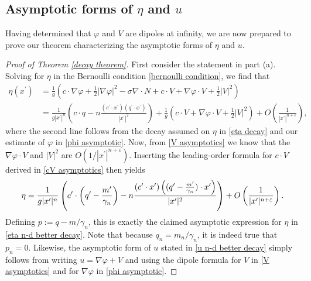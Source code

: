 \documentclass[11pt,reqno]{amsart}
\theoremstyle{plain}
\theoremstyle{remark}
\numberwithin{equation}{section}
\begin{document}
\subsection{Asymptotic forms of \texorpdfstring{$\eta$}{eta} and \texorpdfstring{$u$}{u}}

Having determined that $\varphi$ and $V$ are dipoles at infinity, we are now prepared to prove our theorem characterizing the asymptotic forms of $\eta$ and $u$.  

\begin{proof}[Proof of Theorem \ref{decay theorem}]  First consider the statement in part (a).  Solving for $\eta$ in the Bernoulli condition \eqref{bernoulli condition}, we find that 
\begin{align*}
\eta(x^\prime) & = \frac{1}{g} \left( c\cdot \nabla \varphi + \frac{1}{2} |\nabla \varphi|^2 - \sigma \nabla \cdot N + c \cdot V + \nabla \varphi \cdot V + \frac{1}{2}|V|^2 \right) \\
&= \frac{1}{g|x^\prime|^n} \left( c \cdot q - n \frac{(c^\prime \cdot x^\prime)( q^\prime \cdot x^\prime)}{|x^\prime|^2} \right) + \frac{1}{g} \left( c \cdot V + \nabla \varphi \cdot V + \frac{1}{2}|V|^2 \right) + O\left( \frac{1}{|x^\prime|^{n+\varepsilon}} \right),
\end{align*}
where the second line follows from the decay assumed on $\eta$ in \eqref{eta decay} and our estimate of $\varphi$ in \eqref{phi asymptotic}.  Now, from \eqref{V asymptotics} we know that the $\nabla \varphi \cdot V$ and $|V|^2$ are $O(1/|x^\prime|^{n+\varepsilon})$. 
  Inserting the leading-order formula for $c \cdot V$ derived in \eqref{cV asymptotics} then yields
\[ \eta = \frac{1}{g|x^\prime|^n} \left( c^\prime \cdot \left( q^\prime - {m^\prime\over\gamma_n} \right) -n \frac{(c^\prime \cdot x^\prime)\left( (q^\prime - {m^\prime \over \gamma_n}) \cdot x^\prime \right)}{|x^\prime|^2 }  \right) + O\left( \frac{1}{|x^\prime|^{n+\varepsilon}} \right). \]
Defining $p := q - m/\gamma_n$, this is exactly the claimed asymptotic expression for $\eta$ in \eqref{eta n-d better decay}.  Note that because $q_n = m_n/\gamma_n$, it is indeed true that $p_n = 0$.  Likewise, the asymptotic form of $u$ stated in \eqref{u n-d better decay} simply follows from writing $u = \nabla \varphi + V$ and using the dipole formula for $V$ in \eqref{V asymptotics} and for $\nabla \varphi$ in \eqref{phi asymptotic}.  


\end{proof}
\end{document}
